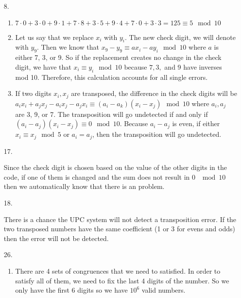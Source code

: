 \documentclass{article}
\theoremstyle{definition}
\begin{document}
\begin{enumerate}
    \item [8. ]
    
    \begin{enumerate}
        \item 
        
        $7\cdot0+3\cdot0+9\cdot1+7\cdot8+3\cdot5+9\cdot4+7\cdot0+3\cdot3 = 125 \equiv 5 \mod 10$
        
        \item 
        
        Let us say that we replace $x_i$ with $y_i$. The new check digit, we will denote with $y_9$. Then we know that $x_9 - y_9 \equiv ax_i - ay_i \mod 10$ where $a$ is either 7, 3, or 9. So if the replacement creates no change in the check digit, we have that $x_i \equiv y_i \mod 10$ because $7, 3,$ and 9 have inverses mod 10. Therefore, this calculation accounts for all single errors. 
        
        \item
        
        If two digits $x_i, x_j$ are transposed, the difference in the check digits will be $a_ix_i + a_jx_j - a_ix_j - a_jx_i \equiv (a_i-a_k)(x_i-x_j)\mod 10$ where $a_i, a_j$ are 3, 9, or 7. The transposition will go undetected if and only if $(a_i-a_j)(x_i-x_j) \equiv 0 \mod 10.$ Because $a_i-a_j$ is even, if either $x_i\equiv x_j \mod 5$ or $a_i = a_j$, then the transposition will go undetected.
        
    \end{enumerate}
    
    \item [17. ]
    
    Since the check digit is chosen based on the value of the other digits in the code, if one of them is changed and the sum does not result in 0 $\mod 10$ then we automatically know that there is an problem. 
    
    \item [18. ]
    
    There is a chance the UPC system will not detect a transposition error. If the two transposed numbers have the same coefficient (1 or 3 for evens and odds) then the error will not be detected.
    
    \item [26. ]
    
    \begin{enumerate}
        \item 
        
        There are 4 sets of congruences that we need to satisfied. In order to satisfy all of them, we need to fix the last 4 digits of the number. So we only have the first 6 digits so we have $10^6$ valid numbers.
        

\end{enumerate}
\end{enumerate}
\end{document}
